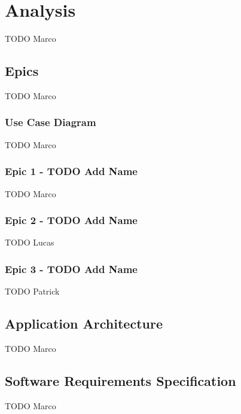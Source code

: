\section{Analysis}
\label{sec:analysis}

TODO Marco

\subsection{Epics}
\label{ssec:epics}

TODO Marco

\subsubsection{Use Case Diagram}
\label{sssec:use_case_diagram}

TODO Marco

\subsubsection{Epic 1 - TODO Add Name}
\label{sssec:epic1}

TODO Marco

\subsubsection{Epic 2 - TODO Add Name}
\label{sssec:epic2}

TODO Lucas

\subsubsection{Epic 3 - TODO Add Name}
\label{sssec:epic3}

TODO Patrick

\subsection{Application Architecture}
\label{ssec:application_architecture}

TODO Marco

\subsection{Software Requirements Specification}
\label{ssec:software_requirements_specification}

TODO Marco